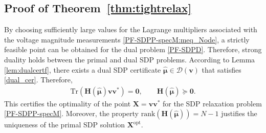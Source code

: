 \documentclass[journal,twoside]{IEEEtran}
\newcommand{\rank}{{\mathrm {rank}}}
\newcommand{\mi}{\mathsf{j}}
\newcommand{\bH}{\mathbf{H}}
\newcommand{\bX}{\mathbf{X}}
\newcommand{\myexp}{\mathrm{e}}
\begin{document}
\subsection{Proof of Theorem~\ref{thm:tightrelax}}\label{appendix:tightrelax}
By choosing sufficiently large values for the Lagrange multipliers associated with the voltage magnitude measurements \eqref{PF-SDPP-specM:meq_Node}, a strictly feasible point can be obtained for the dual problem \eqref{PF-SDPD}.  Therefore, strong duality holds between the primal and dual SDP problems.
According to Lemma \ref{lem:dualcertf}, there exists a dual SDP certificate $\hat{\boldsymbol{\mu}}\in\mathcal{D}(\mathbf{v})$ that satisfies  \eqref{dual_cer}. Therefore,
\begin{align}\label{2propty}
\mathrm{Tr}(\bH(\hat{\boldsymbol{\mu}})\mathbf{v}\mathbf{v}^{\ast}) = \mathbf{0},\qquad \bH(\hat{\boldsymbol{\mu}})\succeq \mathbf{0}.%
\end{align}
This certifies the optimality of the point $\bX=\mathbf{v}\mathbf{v}^{\ast}$ for the SDP relaxation problem \eqref{PF-SDPP-specM}.
Moreover, the property $\rank(\bH(\hat{\boldsymbol{\mu}})) = N-1$
justifies the uniqueness of the primal SDP solution $\bX^{\text{opt}}$.
\end{document}
